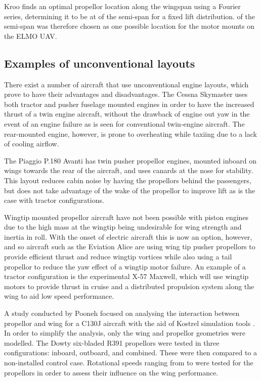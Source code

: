 \documentclass[../../main.tex]{subfiles}
\begin{document}
Kroo finds an optimal propellor location along the wingspan using a Fourier series, determining it to be at  of the semi-span for a fixed lift distribution.
 of the semi-span was therefore chosen as one possible location for the motor mounts on the ELMO UAV.

\subsection{Examples of unconventional layouts} \label{sec:introduction:background-research:examples-of-unconventional-layouts}

There exist a number of aircraft that use unconventional engine layouts, which prove to have their advantages and disadvantages.
The Cessna Skymaster uses both tractor and pusher fuselage mounted engines in order to have the increased thrust of a twin engine aircraft, without the drawback of engine out yaw in the event of an engine failure as is seen for conventional twin-engine aircraft.
The rear-mounted engine, however, is prone to overheating while taxiing due to a lack of cooling airflow.

The Piaggio P.180 Avanti has twin pusher propellor engines, mounted inboard on wings towards the rear of the aircraft, and uses canards at the nose for stability.
This layout reduces cabin noise by having the propellors behind the passengers, but does not take advantage of the wake of the propellor to improve lift as is the case with tractor configurations.

Wingtip mounted propellor aircraft have not been possible with piston engines due to the high mass at the wingtip being undesirable for wing strength and inertia in roll.
With the onset of electric aircraft this is now an option, however, and so aircraft such as the Eviation Alice are using wing tip pusher propellors to provide efficient thrust and reduce wingtip vortices while also using a tail propellor to reduce the yaw effect of a wingtip motor failure.
An example of a tractor configuration is the experimental X-57 Maxwell, which will use wingtip motors to provide thrust in cruise and a distributed propulsion system along the wing to aid low speed performance. 

A study conducted by Pooneh focused on analysing the interaction between propellor and wing for a C130J aircraft with the aid of Kostrel simulation tools \cite{pooneh-18}.
In order to simplify the analysis, only the wing and propellor geometries were modelled.
The Dowty six-bladed R391 propellors were tested in three configurations: inboard, outboard, and combined.
These were then compared to a non-installed control case.
Rotational speeds ranging from  to  were tested for the propellors in order to assess their influence on the wing performance.
\end{document}
